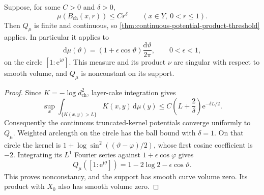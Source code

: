 \begin{proposition}\label{prop:frostman-product-measures}
Suppose, for some $C>0$ and $\delta>0$,
\[
 \mu(B_{\mathrm{ch}}(x,r))\leq Cr^\delta
 \qquad(x\in Y,\ 0<r\leq1).
\]
Then $Q_\mu$ is finite and continuous, so \cref{thm:continuous-potential-product-threshold} applies. In particular it applies to
\[
 \mathrm d\mu(\vartheta)=(1+\epsilon\cos\vartheta)
       \frac{\mathrm d\vartheta}{2\pi},\qquad0<\epsilon<1,
\]
on the circle $[1:\mathrm e^{\mathrm i\vartheta}]$. This measure and its product $\nu$ are singular with respect to smooth volume, and $Q_\mu$ is nonconstant on its support.
\end{proposition}
\begin{proof}
Since $K=-\log d_{\mathrm{ch}}^2$, layer-cake integration gives
\[
 \sup_x\int_{\{K(x,y)>L\}}K(x,y)\,\mathrm d\mu(y)
 \leq C\left(L+\frac2\delta\right)\mathrm e^{-\delta L/2}.
\]
Consequently the continuous truncated-kernel potentials converge uniformly to $Q_\mu$. Weighted arclength on the circle has the ball bound with $\delta=1$. On that circle the kernel is $1+\log\sin^2((\vartheta-\varphi)/2)$, whose first cosine coefficient is $-2$. Integrating its $L^1$ Fourier series against $1+\epsilon\cos\varphi$ gives
\[
 Q_\mu([1:\mathrm e^{\mathrm i\vartheta}])
 =1-2\log2-\epsilon\cos\vartheta.
\]
This proves nonconstancy, and the support has smooth curve volume zero. Its product with $X_0$ also has smooth volume zero.
\end{proof}
